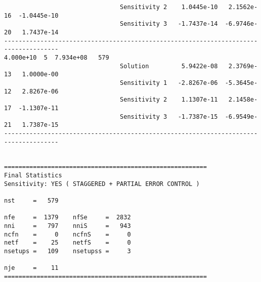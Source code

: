 \begin{verbatim}
                                Sensitivity 2    1.0445e-10   2.1562e-16  -1.0445e-10 
                                Sensitivity 3   -1.7437e-14  -6.9746e-20   1.7437e-14 
-------------------------------------------------------------------------------------
4.000e+10  5  7.934e+08   579
                                Solution         5.9422e-08   2.3769e-13   1.0000e-00 
                                Sensitivity 1   -2.8267e-06  -5.3645e-12   2.8267e-06 
                                Sensitivity 2    1.1307e-11   2.1458e-17  -1.1307e-11 
                                Sensitivity 3   -1.7387e-15  -6.9549e-21   1.7387e-15 
-------------------------------------------------------------------------------------


========================================================
Final Statistics
Sensitivity: YES ( STAGGERED + PARTIAL ERROR CONTROL )

nst     =   579

nfe     =  1379    nfSe     =  2832 
nni     =   797    nniS     =   943 
ncfn    =     0    ncfnS    =     0 
netf    =    25    netfS    =     0 
nsetups =   109    nsetupss =     3 

nje     =    11
========================================================
\end{verbatim}